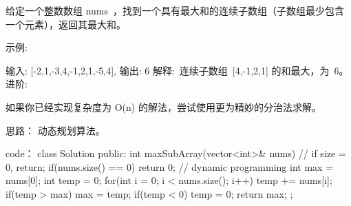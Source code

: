 给定一个整数数组 nums ，找到一个具有最大和的连续子数组（子数组最少包含一个元素），返回其最大和。

示例:

输入: [-2,1,-3,4,-1,2,1,-5,4],
输出: 6
解释: 连续子数组 [4,-1,2,1] 的和最大，为 6。
进阶:

如果你已经实现复杂度为 O(n) 的解法，尝试使用更为精妙的分治法求解。



























思路：
动态规划算法。



























code：
class Solution {
public:
    int maxSubArray(vector<int>& nums) {
        // if size = 0, return;
        if(nums.size() == 0) return 0;
        // dynamic programming
        int max = nums[0];
        int temp = 0;
        for(int i = 0; i < nums.size(); i++)
        {
            temp += nums[i];
            if(temp > max) max = temp;
            if(temp < 0) temp = 0;
        }
        return max;
    }
};